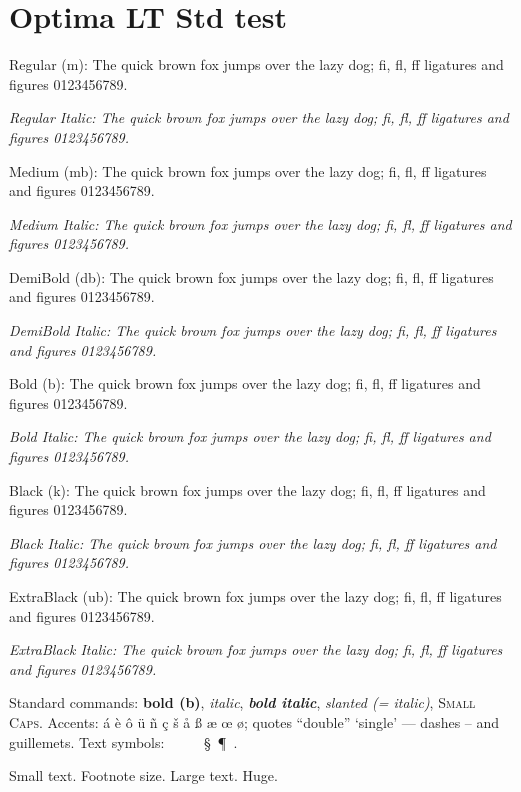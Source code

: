 \documentclass[11pt]{article}
\newcommand{\pangram}{The quick brown fox jumps over the lazy dog; fi, fl,
  ff ligatures and figures 0123456789.}
\begin{document}
\section*{Optima LT Std test}

{\selectfont Regular (m): \pangram\par
 \itshape Regular Italic: \pangram\par}
{\selectfont Medium (mb): \pangram\par
 \itshape Medium Italic: \pangram\par}
{\selectfont DemiBold (db): \pangram\par
 \itshape DemiBold Italic: \pangram\par}
{\selectfont Bold (b): \pangram\par
 \itshape Bold Italic: \pangram\par}
{\selectfont Black (k): \pangram\par
 \itshape Black Italic: \pangram\par}
{\selectfont ExtraBlack (ub): \pangram\par
 \itshape ExtraBlack Italic: \pangram\par}

\medskip
Standard commands: \textbf{bold (b)}, \textit{italic}, \textbf{\textit{bold
italic}}, \textsl{slanted (= italic)}, \textsc{Small Caps}.
Accents: \'a \`e \^o \"u \~n \c{c} \v{s} \r{a} {\ss} {\ae} {\oe} {\o};
quotes ``double'' `single' --- dashes -- and \guillemotleft guillemets\guillemotright.
Text symbols: \textbullet\ \textdegree\ \texteuro\ \textcopyright\
\textregistered\ \S\ \P\ \textperthousand.

{\small Small text. \footnotesize Footnote size.} {\Large Large text.}
{\Huge Huge.}
\end{document}
